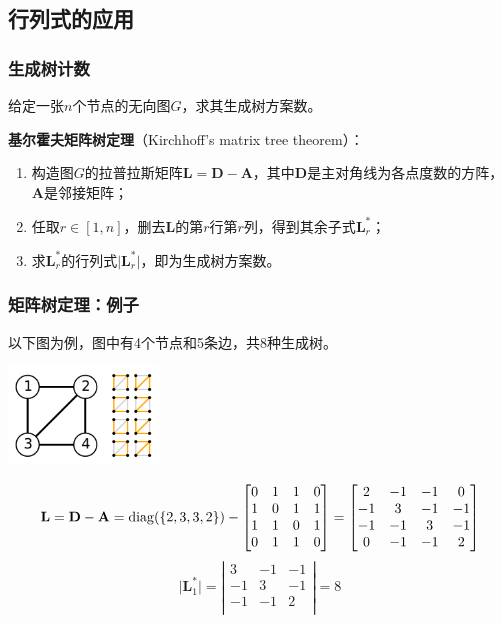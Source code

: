 \documentclass[9pt,dvipsnames]{beamer}
\renewcommand{\det}[1]{\vert{#1}\vert}
\begin{document}
\subsection{行列式的应用}
\begin{frame}
	\frametitle{生成树计数}
	给定一张$n$个节点的无向图$G$，求其生成树方案数。
	\vspace{1em}\pause

	\textbf{基尔霍夫矩阵树定理}（Kirchhoff's matrix tree theorem）：
	\begin{enumerate}
		\item 构造图$G$的拉普拉斯矩阵$\mathbf{L}=\mathbf{D}-\mathbf{A}$，其中$\mathbf{D}$是主对角线为各点度数的方阵，$\mathbf{A}$是邻接矩阵；
		\item 任取$r\in[1,n]$，删去$\mathbf{L}$的第$r$行第$r$列，得到其余子式$\mathbf{L}^*_r$；
		\item 求$\mathbf{L}^*_r$的行列式$\det{\mathbf{L}^*_r}$，即为生成树方案数。
	\end{enumerate}
\end{frame}
\begin{frame}
	\frametitle{矩阵树定理：例子}
	以下图为例，图中有4个节点和5条边，共8种生成树。
	\begin{center}
		\includegraphics[width=0.3\textwidth]{images/matrixtree.png}
	\end{center}
	\[ \mathmakebox[\textwidth][c]{
		\mathbf{L} = \mathbf{D} - \mathbf{A} = \mathrm{diag}(\{2, 3, 3, 2\}) - \left[\begin{matrix}
			0 & 1 & 1 & 0 \\
			1 & 0 & 1 & 1 \\
			1 & 1 & 0 & 1 \\
			0 & 1 & 1 & 0 \\
		\end{matrix}\right] = \left[\begin{matrix}
			 2 & -1 & -1 &  0 \\
			-1 &  3 & -1 & -1 \\
			-1 & -1 &  3 & -1 \\
			 0 & -1 & -1 &  2 \\
		\end{matrix}\right]
	} \]
	\[ \det{\mathbf{L}^*_1} = \left\vert\begin{matrix}
		 3 & -1 & -1 \\
		-1 &  3 & -1 \\
		-1 & -1 &  2 \\
	\end{matrix}\right\vert = 8 \]
\end{frame}
\end{document}

